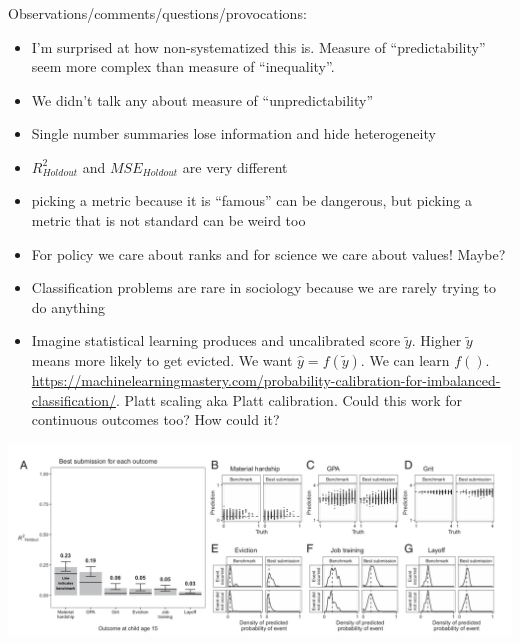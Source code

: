 \documentclass[aspectratio=169]{beamer}
\begin{document}
\begin{frame}
\frametitle{}

Observations/comments/questions/provocations:
\begin{itemize}
\item I'm surprised at how non-systematized this is. Measure of ``predictability'' seem more complex than measure of ``inequality''.
\pause
\item We didn't talk any about measure of ``unpredictability''
\pause
\item Single number summaries lose information and hide heterogeneity
\pause
\item $R^2_{Holdout}$ and $MSE_{Holdout}$ are very different
\pause
\item picking a metric because it is ``famous'' can be dangerous, but picking a metric that is not standard can be weird too
\pause
\item For policy we care about ranks and for science we care about values! Maybe?
\pause
\item Classification problems are rare in sociology because we are rarely trying to do anything
\pause
\item Imagine statistical learning produces and uncalibrated score $\tilde{y}$.  Higher $\tilde{y}$ means more likely to get evicted.   We want $\hat{y} = f(\tilde{y})$.  We can learn $f()$. \url{https://machinelearningmastery.com/probability-calibration-for-imbalanced-classification/}. Platt scaling aka Platt calibration. Could this work for continuous outcomes too? How could it?
\end{itemize}

\end{frame}
\begin{frame}

\begin{center}
\includegraphics[width=\textwidth]{figures/salganik_measuring_2020_fig2}
\end{center}

\end{frame}
\end{document}

